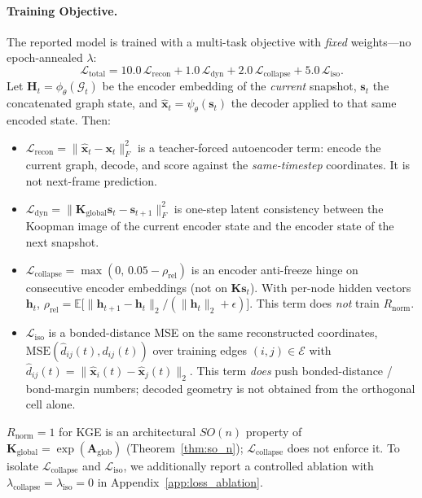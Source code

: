 \documentclass{article}
\newcommand{\K}{\mathbf{K}}
\newcommand{\x}{\mathbf{x}}
\newcommand{\GKE}{\textsc{KGE}}
\begin{document}
\paragraph{Training Objective.}
The reported model is trained with a multi-task objective with \emph{fixed} weights---no epoch-annealed $\lambda$:
\begin{equation}
  \label{eq:total_loss}
  \mathcal{L}_{\text{total}} = 10.0\,\mathcal{L}_{\text{recon}} + 1.0\,\mathcal{L}_{\text{dyn}} + 2.0\,\mathcal{L}_{\text{collapse}} + 5.0\,\mathcal{L}_{\text{iso}}.
\end{equation}
Let $\mathbf{H}_t=\phi_\theta(\mathcal{G}_t)$ be the encoder embedding of the \emph{current} snapshot, $\mathbf{s}_t$ the concatenated graph state, and $\hat{\x}_t=\psi_\theta(\mathbf{s}_t)$ the decoder applied to that same encoded state. Then:
\begin{itemize}[leftmargin=1.5em,itemsep=1pt,topsep=1pt]
  \item $\mathcal{L}_{\text{recon}} = \|\hat{\x}_t - \x_t\|_F^2$ is a teacher-forced autoencoder term: encode the current graph, decode, and score against the \emph{same-timestep} coordinates. It is not next-frame prediction.
  \item $\mathcal{L}_{\text{dyn}} = \|\K_{\text{global}}\mathbf{s}_t - \mathbf{s}_{t+1}\|_F^2$ is one-step latent consistency between the Koopman image of the current encoder state and the encoder state of the next snapshot.
  \item $\mathcal{L}_{\text{collapse}} = \max(0,\, 0.05 - \rho_{\text{rel}})$ is an encoder anti-freeze hinge on consecutive encoder embeddings (not on $\K\mathbf{s}_t$). With per-node hidden vectors $\mathbf{h}_t$, $\rho_{\text{rel}} = \mathbb{E}\bigl[\|\mathbf{h}_{t+1}-\mathbf{h}_t\|_2/(\|\mathbf{h}_t\|_2+\epsilon)\bigr]$. This term does \emph{not} train $R_{\mathrm{norm}}$.
  \item $\mathcal{L}_{\text{iso}}$ is a bonded-distance MSE on the same reconstructed coordinates, $\mathrm{MSE}(\hat{d}_{ij}(t), d_{ij}(t))$ over training edges $(i,j)\in\mathcal{E}$ with $\hat{d}_{ij}(t)=\|\hat{\x}_i(t)-\hat{\x}_j(t)\|_2$. This term \emph{does} push bonded-distance / bond-margin numbers; decoded geometry is not obtained from the orthogonal cell alone.
\end{itemize}
$R_{\mathrm{norm}}=1$ for \GKE{} is an architectural $SO(n)$ property of $\K_{\text{global}}=\exp(\mathbf{A}_{\mathrm{glob}})$ (Theorem~\ref{thm:so_n}); $\mathcal{L}_{\text{collapse}}$ does not enforce it. To isolate $\mathcal{L}_{\text{collapse}}$ and $\mathcal{L}_{\text{iso}}$, we additionally report a controlled ablation with $\lambda_{\text{collapse}}=\lambda_{\text{iso}}=0$ in Appendix~\ref{app:loss_ablation}.
\end{document}
